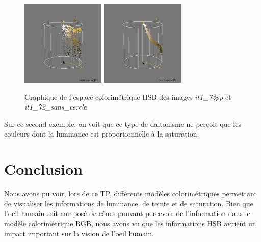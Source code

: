\documentclass[a4paper,10pt]{article}
\begin{document}
\begin{figure}[!h]
 \begin{center}
 \includegraphics[width=4cm]{resultat/compare2_1.png}
 \includegraphics[width=4cm]{resultat/compare2_2.png}
 \caption{Graphique de l'espace colorimétrique HSB des images \textit{it1\_72pp} et \textit{it1\_72\_sans\_cercle}}
 \end{center}
\end{figure}

\newpage

Sur ce second exemple, on voit que ce type de daltonisme ne perçoit que les couleurs dont la luminance est proportionnelle à 
la saturation.

\section{Conclusion}
Nous avons pu voir, lors de ce TP, différents modèles colorimétriques permettant de visualiser les informations de luminance, de 
teinte et de saturation. Bien que l'oeil humain soit composé de cônes pouvant percevoir de l'information dans le modèle
colorimétrique RGB, nous avons vu que les informations HSB avaient un impact important sur la vision de l'oeil humain.

\newpage
\end{document}
